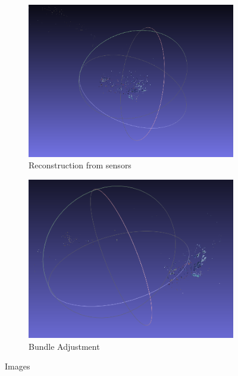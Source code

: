 \documentclass{article}
\begin{document}
\begin{enumerate}
\begin{figure}[H]
					\begin{subfigure}{.7\textwidth}
					  	\centering
					  	\includegraphics[width=1.0\linewidth]{1_sensors.png}
					  	\caption{Reconstruction from sensors}
					  	\label{fig:sub2}
					\end{subfigure}
					\begin{subfigure}{.7\textwidth}
					  	\centering
					  	\includegraphics[width=1.0\linewidth]{1_bundler.png}
					  	\caption{Bundle Adjustment}
					  	\label{fig:sub2}
					\end{subfigure}
					\caption{Images}
					\label{figstart}



\end{figure}
\end{enumerate}
\end{document}
